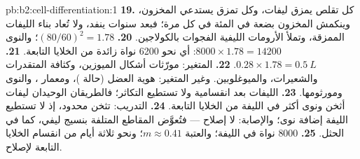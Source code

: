 \begin{solution}{pb:b2:cell-differentiation:1}
\textbf{19.} كل تقلص يمزق ليفات، وكل تمزق يستدعي
المخزون، وينكمش المخزون بضعة في المئة في كل مرة؛ فبعد سنوات
ينفد، ولا تُعاد بناء الليفات الممزقة، وتملأ الأرومات الليفية
الفجوات بالكولاجين.
\textbf{20.} $(80/60)^{2} = 1.78$؛ والنوى $8000\times 1.78 = \num{14200}$:
أي نحو \num{6200} نواة زائدة من الخلايا التابعة.
\textbf{21.} $0.28\times 1.78 = \qty{0.5}{L}$.
\textbf{22.} المتغير: مورّثات أشكال الميوزين، وكثافة المتقدرات
والشعيرات، والميوغلوبين. وغير المتغير: هوية العضل (حالة
)، ومعمار ، والنوى ومورثومها.
\textbf{23.} الليفات بعد انقسامية ولا تستطيع التكاثر؛ فالطريقان
الوحيدان ليفات أثخن ونوى أكثر في الليفة من الخلايا
التابعة.
\textbf{24.} التدريب: تثخن محدود، إذ لا تستطيع الليفة إضافة
نوى؛ والإصابة: لا إصلاح --- فتُعوَّض المقاطع المتلفة
بنسيج ليفي، كما في الحثل.
\textbf{25.} \num{8000} نواة في الليفة؛ والعتبة $m \approx 0.41$؛
ونحو ثلاثة أيام من انقسام الخلايا التابعة لإصلاح.
\end{solution}
